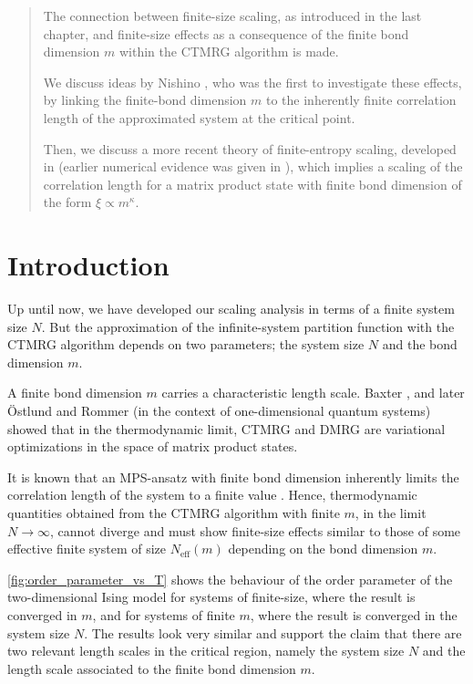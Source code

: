 \begin{abstract}
The connection between finite-size scaling, as introduced in the last chapter,
and finite-size effects as a consequence of the finite bond dimension $m$ within the CTMRG algorithm is made.

We discuss ideas by Nishino \cite{nishino1996numerical}, who was the first to investigate these effects,
by linking the finite-bond dimension $m$ to the inherently finite correlation length of the approximated system at the
critical point.

Then, we discuss a more recent theory of finite-entropy scaling, developed in \cite{pollmann2009theory} (earlier
numerical evidence was given in \cite{tagliacozzo2008scaling, andersson1999density}),
which implies a scaling of the correlation length for a matrix product state with finite bond dimension of the form $\xi
\propto m^{\kappa}$.
\end{abstract}

\section{Introduction}

Up until now, we have developed our scaling analysis in terms of a finite system size $N$.
But the approximation of the infinite-system partition function with the CTMRG algorithm depends on two parameters;
the system size $N$ and the bond dimension $m$.

A finite bond dimension $m$ carries a characteristic length scale.
Baxter \cite{baxter1978variational}, and later Östlund and Rommer \cite{ostlund1995thermodynamic} (in the context of
one-dimensional quantum systems) showed that in the thermodynamic limit,
CTMRG and DMRG are variational optimizations in the space of matrix product states.

It is known that an MPS-ansatz with finite bond dimension inherently limits the
correlation length of the system to a finite value \cite{wolf2006quantum, rommer1997class}. Hence,
thermodynamic quantities obtained from the CTMRG algorithm with finite $m$, in the limit
$N \to \infty$, cannot diverge and must show finite-size effects similar to those of some
effective finite system of size $N_{\text{eff}}(m)$ depending on the bond dimension $m$.

\autoref{fig:order_parameter_vs_T} shows the behaviour of the order parameter of the
two-dimensional Ising model for systems of finite-size,
where the result is converged in $m$, and for systems of finite $m$, where
the result is converged in the system size $N$. The results look very similar and support
the claim that there are two relevant length scales in the critical region, namely the system size $N$ and
the length scale associated to the finite bond dimension $m$.

